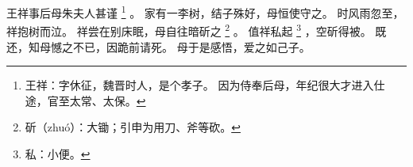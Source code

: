 
\switchcolumn*[\section{}]

王祥事后母朱夫人甚谨%
\footnote{%
    王祥：字休征，魏晋时人，是个孝子。
          因为侍奉后母，年纪很大才进入仕途，官至太常、太保。
}%
。
家有一李树，结子殊好，母恒使守之。
时风雨忽至，祥抱树而泣。
祥尝在别床眠，母自往暗斫之%
\footnote{%
    斫（zhuó）：大锄；引申为用刀、斧等砍。
}%
。
值祥私起%
\footnote{%
    私：小便。
}%
，空斫得被。
既还，知母憾之不已，因跪前请死。
母于是感悟，爱之如己子。

\switchcolumn



